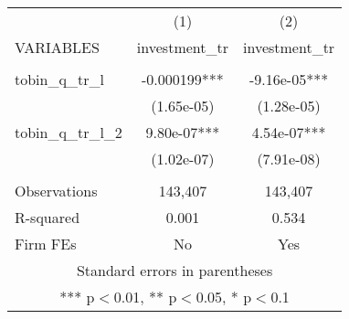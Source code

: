\begin{tabular}{lcc} \hline
 & (1) & (2) \\
VARIABLES & investment\_tr & investment\_tr \\ \hline
 &  &  \\
tobin\_q\_tr\_l & -0.000199*** & -9.16e-05*** \\
 & (1.65e-05) & (1.28e-05) \\
tobin\_q\_tr\_l\_2 & 9.80e-07*** & 4.54e-07*** \\
 & (1.02e-07) & (7.91e-08) \\
 &  &  \\
Observations & 143,407 & 143,407 \\
R-squared & 0.001 & 0.534 \\
 Firm FEs & No & Yes \\ \hline
\multicolumn{3}{c}{ Standard errors in parentheses} \\
\multicolumn{3}{c}{ *** p$<$0.01, ** p$<$0.05, * p$<$0.1} \\
\end{tabular}
